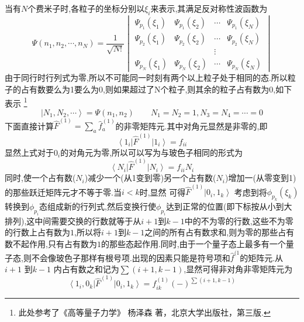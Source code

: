 当有$N$个费米子时,各粒子的坐标分别以$\xi_i$来表示,其满足反对称性波函数为
\begin{equation}
  \Psi (n_1,n_2,\cdots,n_N)=\frac{1}{\sqrt{N!}}
  \begin{vmatrix}
    \Psi_{p_1}(\xi_1)&\Psi_{p_1}(\xi_2)&\cdots&\Psi_{p_1}(\xi_N)\\
    \Psi_{p_2}(\xi_1)&\Psi_{p_2}(\xi_2)&\cdots&\Psi_{p_2}(\xi_N)\\
    &&\vdots &\\
    \Psi_{p_N}(\xi_1)&\Psi_{p_N}(\xi_2)&\cdots&\Psi_{p_N}(\xi_N)
  \end{vmatrix}
\end{equation}
由于同行时行列式为零,所以不可能同一时刻有两个以上粒子处于相同的态.所以粒子的占有数要么为1要么为0,则如果超过了N个粒子,则其余的粒子占有数为0,如下表示
\footnote{此处参考了《高等量子力学》 杨泽森 著，北京大学出版社，第三版.}
\begin{equation}
  \left|N_1,N_2,\cdots\right>=\Psi(n_1,n_2)
  \qquad
  N_1=N_2=1,N_3=N_4=\cdots =0
  \label{eq:twoliangzifermi}
\end{equation}
下面直接计算$\hat{F}^{(1)}=\sum_a \hat{f}_a^{(1)}$的非零矩阵元.其中对角元显然是非零的,即
\begin{equation}
  \left<1_i\right|\hat{F}^{(1)}\left|1_i\right>=f_{ii}
  \label{eq:ercifermi0}
\end{equation}
显然上式对于$0_i$的对角元为零,所以可以写为与玻色子相同的形式为
\begin{equation}
  \left<N_i\right|\hat{F}^{(1)}\left|N_i\right>=f_{ii}N_i
  \label{eq:ercifermi1}
\end{equation}
同时,使一个占有数($N_i$)减少一个(从1变到零)另一个占有数($N_i$)增加一(从零变到1)的那些跃迁矩阵元才不等于零.当$i<k$时,显然
可得$\hat{F}^{(1)}\left|0_i,1_k\right>$ 考虑到将$\phi_{p_k}(\xi_k)$转换到$\phi_{p_i}$态组成新的行列式,然后变换行使$\phi_{p_i}$达到正常的位置(即下标按从小到大排列),这中间需要交换的行数就等于从$i+1$到$k-1$中的不为零的行数,这些不为零的行数上占有数为$1$,所以将$i+1$到$k-1$之间的所有占有数求和,则为零的那些占有数不起作用,只有占有数为$1$的那些态起作用.同时,由于一个量子态上最多有一个量子态,则不会像玻色子那样有根号项.出现的因素只能是符号项和$\hat{f}^{(1}$的矩阵元.从$i+1$ 到$k-1$ 内占有数之和记为$\sum (i+1,k-1)$,显然可得非对角非零矩阵元为
  \begin{equation}
    \left<1_i,0_k\right|\hat{F}^{(1)}\left|0_i,1_k\right>=f^{(1)}_{ik}(-)^{\sum (i+1,k-1)}
    \label{eq:ercifermi2}
  \end{equation}


